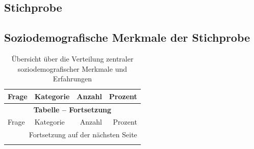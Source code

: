 \appendix
{}

\begin{appendices}


\section{Stichprobe}
\subsection{Soziodemografische Merkmale der Stichprobe}
\label{sec:appendix_demographics}

\begin{longtable}{p{5.5cm}p{5.5cm}rr}
    \caption{Übersicht über die Verteilung zentraler soziodemografischer Merkmale und Erfahrungen}
    \label{tab:soziodemografie_gesamt}\\
    \toprule
    Frage & Kategorie & Anzahl & Prozent \\
    \midrule
    \endfirsthead

    \multicolumn{4}{c}{{\bfseries Tabelle \thetable{} -- Fortsetzung}} \\
    \toprule
    Frage & Kategorie & Anzahl & Prozent \\
    \midrule
    \endhead
    
    \midrule
    \multicolumn{4}{r}{Fortsetzung auf der nächsten Seite}\\
    \endfoot
    
    \bottomrule
    \endlastfoot


\end{longtable}
\end{appendices}
